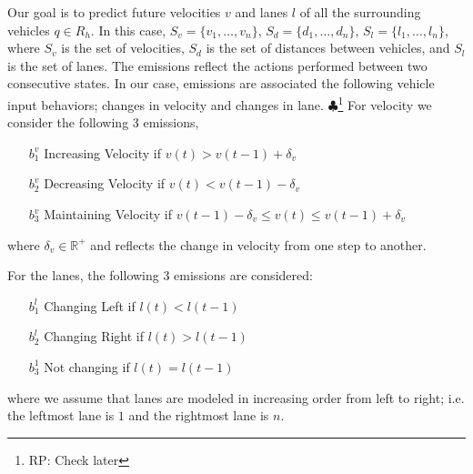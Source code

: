 \documentclass[letterpaper, 10 pt, conference]{ieeeconf}  %
\newcommand\NB[1]{$\spadesuit$\footnote{NB: #1}}
\newcommand\RP[1]{$\clubsuit$\footnote{RP: #1}}
\begin{document}
Our goal is to predict future velocities $v$ and lanes $l$ of all the surrounding vehicles $q\in R_h$. In this case, $S_v = \{v_1,\ldots, v_n\}$, $S_d = \{d_1,\ldots,d_n\}$, $S_l = \{l_1,\ldots,l_n\}$, where $S_v$ is the set of velocities, $S_d$ is the set of distances between vehicles, and $S_l$ is the set of lanes. The emissions reflect the actions performed between two consecutive states. In our case, emissions are associated the following vehicle input behaviors; changes in velocity and changes in lane. \RP{Check later} %
For velocity we consider the following 3 emissions,
    

\begin{itemize}
    \item[$b_1^v$] {Increasing Velocity if $v(t) > v(t-1)+\delta_v$} 
    \item[$b_2^v$] {Decreasing Velocity if $v(t) < v(t-1)-\delta_v$}
    \item[$b_3^v$] {Maintaining Velocity if $v(t-1)-\delta_v \leq v(t) \leq v(t-1)+\delta_v$}
\end{itemize}
where $\delta_v\in\mathbb{R}^+$ and reflects the change in velocity from one step to another.

For the lanes, the following 3 emissions are considered:

\begin{enumerate}
    \item[$b_1^l$] Changing Left if $l(t) < l(t-1)$
    \item[$b_2^l$] Changing Right if $l(t) > l(t-1)$
    \item[$b_3^1$] Not changing if  $l(t) = l(t-1)$
\end{enumerate}
where we assume that lanes are modeled in increasing order from left to right; i.e. the leftmost lane is $1$ and the rightmost lane is $n$.
\end{document}
